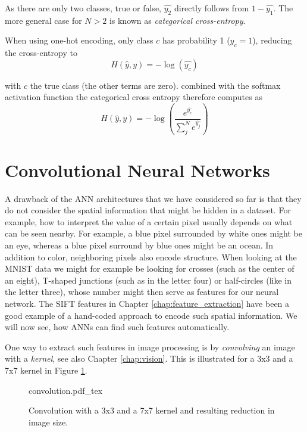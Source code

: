 As there are only two classes, true or false, $\hat{y_2}$ directly follows from $1-\hat{y_1}$. 
The more general case for $N>2$ is known as \emph{categorical cross-entropy}. 

When using one-hot encoding, only class $c$ has probability 1 ($y_c=1$), reducing the cross-entropy to 
\begin{equation}
H(\hat{y},y)=-\log(\hat{y_c})
\end{equation}

with $c$ the true class (the other terms are zero). 
combined with the softmax activation function the categorical cross entropy therefore computes as
\begin{equation}
H(\hat{y},y) = -\log\left(\frac{e^{\hat{y_c}}}{\sum_{j}^N e^{\hat{y_j}}}\right)
\end{equation}


\section{Convolutional Neural Networks}
A drawback of the ANN architectures that we have considered so far is that they do not consider the spatial information that might be hidden in a dataset. 
For example, how to interpret the value of a certain pixel usually depends on what can be seen nearby. For example, a blue pixel surrounded by white ones might be an eye, whereas a blue pixel surround by blue ones might be an ocean. In addition to color, neighboring pixels also encode structure. When looking at the MNIST data we might for example be looking for crosses (such as the center of an eight), T-shaped junctions (such as in the letter four) or half-circles (like in the letter three), whose number might then serve as features for our neural network. The SIFT features in Chapter \ref{chap:feature_extraction} have been a good example of a hand-coded approach to encode such spatial information. We will now see, how ANNs can find such features automatically. 

One way to extract such features in image processing is by \emph{convolving} an image with a \emph{kernel}, see also Chapter \ref{chap:vision}. This is illustrated for a 3x3 and a 7x7 kernel in Figure \ref{fig:convolution}.


\begin{figure}[htb]
    \centering
    \def\svgwidth{0.8\textwidth}
    {convolution.pdf_tex}
    \caption{Convolution with a 3x3 and a 7x7 kernel and resulting reduction in image size.\label{fig:convolution}}
\end{figure}

